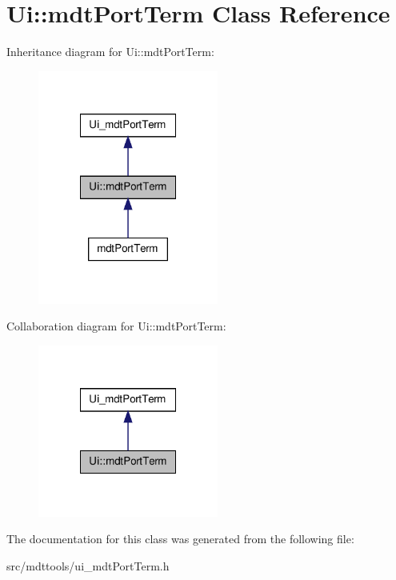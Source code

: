 \hypertarget{class_ui_1_1mdt_port_term}{
\section{Ui::mdtPortTerm Class Reference}
\label{class_ui_1_1mdt_port_term}
}


Inheritance diagram for Ui::mdtPortTerm:\nopagebreak
\begin{figure}[H]
\begin{center}
\leavevmode
\includegraphics[width=168pt]{class_ui_1_1mdt_port_term__inherit__graph}
\end{center}
\end{figure}


Collaboration diagram for Ui::mdtPortTerm:\nopagebreak
\begin{figure}[H]
\begin{center}
\leavevmode
\includegraphics[width=168pt]{class_ui_1_1mdt_port_term__coll__graph}
\end{center}
\end{figure}


The documentation for this class was generated from the following file:\begin{DoxyCompactItemize}
\item 
src/mdttools/ui\_\-mdtPortTerm.h\end{DoxyCompactItemize}
